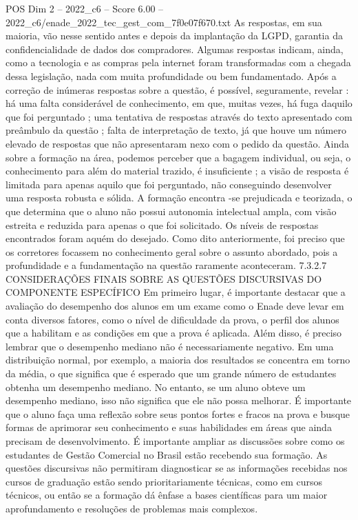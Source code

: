\begin{textsample}{POS Dim 2 – 2022\_c6 – Score 6.00 – 2022\_c6/enade\_2022\_tec\_gest\_com\_7f0e07f670.txt}
As respostas, em sua maioria, vão nesse sentido antes e depois da implantação da LGPD, garantia da confidencialidade de dados dos compradores.
Algumas respostas indicam, ainda, como a tecnologia e as compras pela internet foram transformadas com a chegada dessa legislação, nada com muita profundidade ou bem fundamentado.
Após a correção de inúmeras respostas sobre a questão, é possível, seguramente, revelar : há uma falta considerável de conhecimento, em que, muitas vezes, há fuga daquilo que foi perguntado ; uma tentativa de respostas através do texto apresentado com preâmbulo da questão ; falta de interpretação de texto, já que houve um número elevado de respostas que não apresentaram nexo com o pedido da questão.
Ainda sobre a formação na área, podemos perceber que a bagagem individual, ou seja, o conhecimento para além do material trazido, é insuficiente ; a visão de resposta é limitada para apenas aquilo que foi perguntado, não conseguindo desenvolver uma resposta robusta e sólida.
A formação encontra -se prejudicada e teorizada, o que determina que o aluno não possui autonomia intelectual ampla, com visão estreita e reduzida para apenas o que foi solicitado.
Os níveis de respostas encontrados foram aquém do desejado.
Como dito anteriormente, foi preciso que os corretores focassem no conhecimento geral sobre o assunto abordado, pois a profundidade e a fundamentação na questão raramente aconteceram. 7.3.2.7 CONSIDERAÇÕES FINAIS SOBRE AS QUESTÕES DISCURSIVAS DO COMPONENTE ESPECÍFICO Em primeiro lugar, é importante destacar que a avaliação do desempenho dos alunos em um exame como o Enade deve levar em conta diversos fatores, como o nível de dificuldade da prova, o perfil dos alunos que a habilitam e as condições em que a prova é aplicada.
Além disso, é preciso lembrar que o desempenho mediano não é necessariamente negativo.
Em uma distribuição normal, por exemplo, a maioria dos resultados se concentra em torno da média, o que significa que é esperado que um grande número de estudantes obtenha um desempenho mediano.
No entanto, se um aluno obteve um desempenho mediano, isso não significa que ele não possa melhorar.
É importante que o aluno faça uma reflexão sobre seus pontos fortes e fracos na prova e busque formas de aprimorar seu conhecimento e suas habilidades em áreas que ainda precisam de desenvolvimento.
É importante ampliar as discussões sobre como os estudantes de Gestão Comercial no Brasil estão recebendo sua formação.
As questões discursivas não permitiram diagnosticar se as informações recebidas nos cursos de graduação estão sendo prioritariamente técnicas, como em cursos técnicos, ou então se a formação dá ênfase a bases científicas para um maior aprofundamento e resoluções de problemas mais complexos.

\end{textsample}
